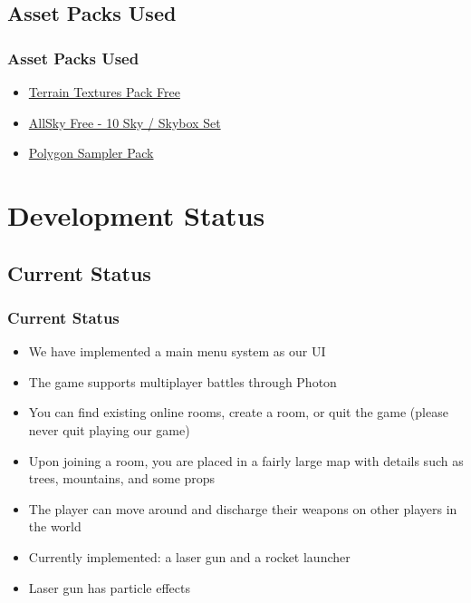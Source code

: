 \documentclass{beamer}
\begin{document}
\subsection{Asset Packs Used}
\begin{frame}
\frametitle{Asset Packs Used}
    \begin{itemize}
        \item \href{https://assetstore.unity.com/packages/2d/textures-materials/nature/terrain-textures-pack-free-139542}{Terrain Textures Pack Free}
        \item \href{https://assetstore.unity.com/packages/2d/textures-materials/sky/allsky-free-10-sky-skybox-set-146014}{AllSky Free - 10 Sky / Skybox Set}
        \item \href{https://assetstore.unity.com/packages/3d/environments/polygon-sampler-pack-207048}{Polygon Sampler Pack}
    \end{itemize}
\end{frame}

\section{Development Status}

\subsection{Current Status}
\begin{frame}
\frametitle{Current Status}
    \begin{itemize}
        \item We have implemented a main menu system as our UI
        \item The game supports multiplayer battles through Photon
        \item You can find existing online rooms, create a room, or quit the game (please never quit playing our game)
        \item Upon joining a room, you are placed in a fairly large map with details such as trees, mountains, and some props
        \item The player can move around and discharge their weapons on other players in the world
        \item Currently implemented: a laser gun and a rocket launcher
        \item Laser gun has particle effects
    \end{itemize}
\end{frame}
\end{document}
